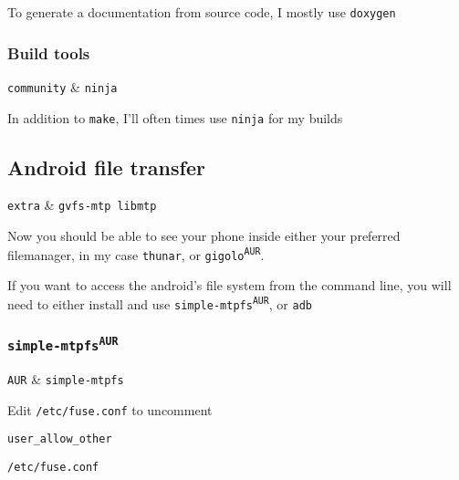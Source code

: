 \documentclass[10pt]{dustdoc}
\begin{document}
To generate a documentation from source code, I mostly use \texttt{doxygen}

\subsubsection{Build tools}%
\label{sec:build-tools}

\begin{pkgtable}
    \texttt{community} & \texttt{ninja} \\
\end{pkgtable}

In addition to \texttt{make}, I’ll often times use \texttt{ninja} for my builds

\subsection{Android file transfer}%
\label{sec:android-file-transfer}

\begin{pkgtable}
    \texttt{extra} & \texttt{gvfs-mtp libmtp} \\
\end{pkgtable}

Now you should be able to see your phone inside either your preferred filemanager, in my case \texttt{thunar}, or \texttt{gigolo\textsuperscript{\texttt{AUR}}}.

If you want to access the android’s file system from the command line, you will need to either install and use \texttt{simple-mtpfs\textsuperscript{\texttt{AUR}}}, or \texttt{adb}

\subsubsection{\texttt{simple-mtpfs\texorpdfstring{\textsuperscript{AUR}}{ (AUR)}}}%
\label{sec:simple-mtpfs-aur}

\begin{pkgtable}
    \texttt{AUR} & \texttt{simple-mtpfs} \\
\end{pkgtable}

Edit \texttt{/etc/fuse.conf} to uncomment

\begin{mintedlisting}
    \begin{verbatim}
user_allow_other
    \end{verbatim}

    \caption{\texttt{/etc/fuse.conf}}
\end{mintedlisting}
\end{document}
